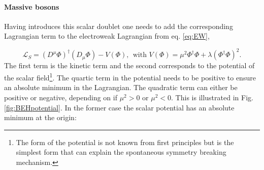 \paragraph{Massive bosons}
Having introduces this scalar doublet one needs to add the corresponding Lagrangian term to the electroweak Lagrangian from eq. \ref{eq:EW}, 

\begin{equation}
\label{eq:higgslagrangian}
\mathcal{L}_S = \left(D^\mu\Phi\right)^\dagger \left(D_\mu \Phi\right) - V\left(\Phi\right), \ \ \textrm{with } V\left(\Phi\right) = \mu^2 \Phi^\dagger\Phi + \lambda \left(\Phi^\dagger \Phi\right)^2. 
\end{equation}
\noindent The first term is the kinetic term and the second corresponds to the potential of the scalar field\footnote{The form of the potential is not known from first principles but is the simplest form that can explain the spontaneous symmetry breaking mechanism.}. The quartic term in the potential needs to be positive to ensure an absolute minimum in the Lagrangian. The quadratic term can either be positive or negative, depending on if $\mu^2 > 0$ or $\mu^2 < 0$. This is illustrated in Fig. \ref{fig:BEHpotential}. In the former case the scalar potential has an absolute minimum at the origin:

